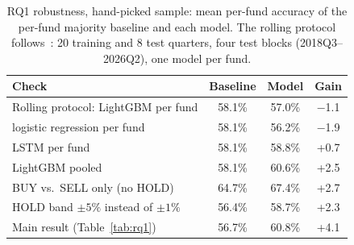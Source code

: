 \begin{table}[t]
  \caption{RQ1 robustness, hand-picked sample: mean per-fund accuracy of the per-fund majority
  baseline and each model. The rolling protocol follows~\cite{cohen2026mimicking}: 20 training and
  8 test quarters, four test blocks (2018Q3--2026Q2), one model per fund.}
  \label{tab:robust}
  \small
  \setlength{\tabcolsep}{3.5pt}
  \begin{tabular}{@{}lccc@{}}
    \toprule
    Check & Baseline & Model & Gain \\
    \midrule
    Rolling protocol: LightGBM per fund & 58.1\% & 57.0\% & \ensuremath{-}1.1 \\
    \quad logistic regression per fund & 58.1\% & 56.2\% & \ensuremath{-}1.9 \\
    \quad LSTM per fund & 58.1\% & 58.8\% & +0.7 \\
    \quad LightGBM pooled & 58.1\% & 60.6\% & +2.5 \\
    BUY vs.\ SELL only (no HOLD) & 64.7\% & 67.4\% & +2.7 \\
    HOLD band $\pm5\%$ instead of $\pm1\%$ & 56.4\% & 58.7\% & +2.3 \\
    \midrule
    Main result (Table~\ref{tab:rq1}) & 56.7\% & 60.8\% & +4.1 \\
    \bottomrule
  \end{tabular}
\end{table}
